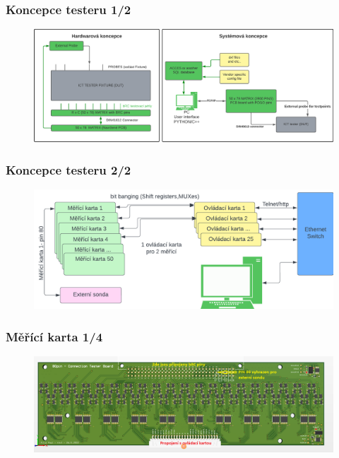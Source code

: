 \documentclass[%
  12pt,       				%
	t,                  %
	aspectratio=1610,   %
	unicode,						%
]{beamer}				    	%
\begin{document}
\begin{frame} 
	\frametitle{Koncepce testeru 1/2}
	\vspace*{0.5cm}
	\begin{figure}[ht!]
		\centering
		\includegraphics[width = \textwidth]{obrazky/system_connection_and_fixture.png}
	\end{figure}
\end{frame}

\begin{frame} 
	\frametitle{Koncepce testeru 2/2}
	\vspace*{0.5cm}
	\begin{figure}[ht!]
		\centering
		\includegraphics[width = \textwidth]{obrazky/telnet_http_pc.png}
	\end{figure}
\end{frame}


\begin{frame} 
	\frametitle{Měřící karta 1/4}
	\vspace*{0.7cm}
	\begin{figure}[ht!]
		\centering
		\includegraphics[width = \textwidth]{obrazky/karta_3D_NP.png}
	\end{figure}
\end{frame}
\end{document}
